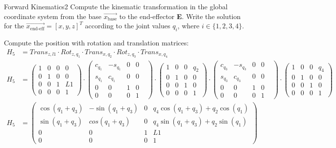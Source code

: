 \begin{questions}


\begin{question}{Forward Kinematics}{2}
Compute the kinematic transformation in the global coordinate system from the base $\vec{x_\textrm{base}}$ to the end-effector \textbf{E}.  
Write the solution for the $\vec{x_\textrm{end-eff}}=[x,y,z]^T$  according to the joint values $q_i$, where $i \in \{1,2,3,4\}$.

\begin{answer}
	Compute the position with rotation and translation matrices:
	\begin{equation}
		\begin{split}
			H_5 &= Trans_{z,l1}\cdot Rot_{z,q_1}\cdot Trans_{x,q_2}\cdot Rot_{z,q_3}\cdot Trans_{x,q_4}\\
			H_5 &= 
			\begin{pmatrix} 
				1& 0& 0& 0\\
				0& 1& 0& 0\\
				0& 0& 1& L1\\
				0& 0& 0& 1
			\end{pmatrix}
			\cdot
			\begin{pmatrix}
				c_{q_1}& -s_{q_1}& 0& 0\\
				s_{q_1}& c_{q_1}& 0& 0\\
				0& 0& 1& 0&\\
				0& 0& 0& 1&
			\end{pmatrix}
			\cdot
			\begin{pmatrix} 
				1& 0& 0& q_2\\
				0& 1& 0& 0\\
				0& 0& 1& 0\\
				0& 0& 0& 1
			\end{pmatrix}
			\cdot
			\begin{pmatrix}
				c_{q_3}& -s_{q_3}& 0& 0\\
				s_{q_3}& c_{q_3}& 0& 0\\
				0& 0& 1& 0&\\
				0& 0& 0& 1&
			\end{pmatrix}
			\cdot
			\begin{pmatrix} 
				1& 0& 0& q_4\\
				0& 1& 0& 0\\
				0& 0& 1& 0\\
				0& 0& 0& 1
			\end{pmatrix}\\
			H_5 &= 
			\begin{pmatrix}
				\cos(q_1+q_3)& -\sin(q_1+q_3)& 0& q_4\cos(q_1+q_3) + q_2\cos(q_1)\\
				\sin(q_1+q_3)& cos(q_1+q_3)& 0& q_4\sin(q_1+q_3) + q_2\sin(q_1)\\
				0& 0& 1& L1\\
				0& 0& 0& 1
			\end{pmatrix}
		\end{split}
	\end{equation}
	

\end{answer}
\end{question}
\end{questions}
